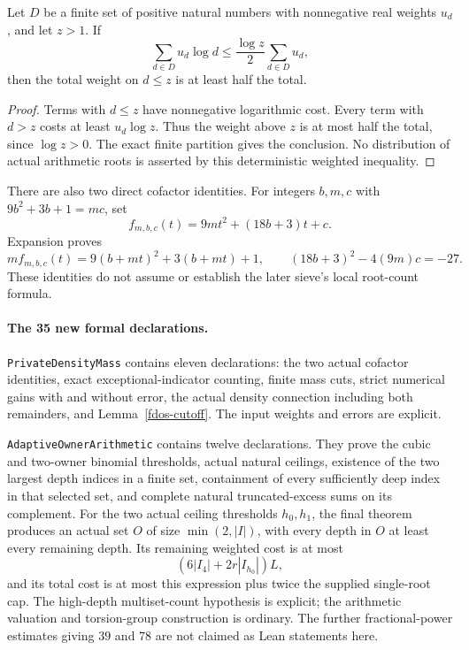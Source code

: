 \begin{lemma}\label{fdos-cutoff}
Let $D$ be a finite set of positive natural numbers with nonnegative
real weights $u_d$, and let $z>1$. If
\[
 \sum_{d\in D}u_d\log d\le
             \frac{\log z}{2}\sum_{d\in D}u_d,
\]
then the total weight on $d\le z$ is at least half the total.
\end{lemma}
\begin{proof}
Terms with $d\le z$ have nonnegative logarithmic cost. Every term
with $d>z$ costs at least $u_d\log z$. Thus the weight above $z$
is at most half the total, since $\log z>0$. The exact finite
partition gives the conclusion. No distribution of actual arithmetic
roots is asserted by this deterministic weighted inequality.
\end{proof}

There are also two direct cofactor identities. For integers $b,m,c$
with $9b^2+3b+1=mc$, set
\[
 f_{m,b,c}(t)=9mt^2+(18b+3)t+c.
\]
Expansion proves
\[
 m f_{m,b,c}(t)=9(b+mt)^2+3(b+mt)+1,
 \qquad (18b+3)^2-4(9m)c=-27.
\]
These identities do not assume or establish the later sieve's local
root-count formula.

\paragraph{The 35 new formal declarations.}
\texttt{PrivateDensity\allowbreak Mass} contains eleven declarations:
the two actual cofactor identities, exact exceptional-indicator counting,
finite mass cuts, strict numerical gains with and without error,
the actual density connection including both remainders, and
Lemma~\ref{fdos-cutoff}. The input weights and errors are explicit.

\texttt{AdaptiveOwner\allowbreak Arithmetic} contains twelve declarations.
They prove the cubic and two-owner binomial thresholds, actual natural
ceilings, existence of the two largest depth indices in a finite set,
containment of every sufficiently deep index in that selected set,
and complete natural truncated-excess sums on its complement.
For the two actual ceiling thresholds $h_0,h_1$, the final theorem
produces an actual set $O$ of size $\min(2,|I|)$, with every depth
in $O$ at least every remaining depth. Its remaining weighted cost is
at most
\[
 (6|I_4|+2r|I_{h_0}|)L,
\]
and its total cost is at most this expression plus twice the supplied
single-root cap. The high-depth multiset-count hypothesis is explicit;
the arithmetic valuation and torsion-group construction is ordinary.
The further fractional-power estimates giving $39$ and $78$ are not
claimed as Lean statements here.

